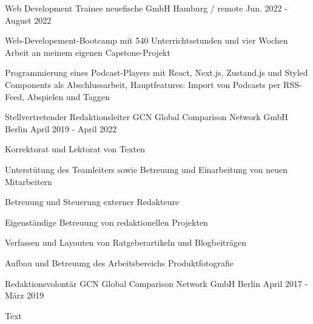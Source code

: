 

\begin{cventries}

  \cventry
    {Web Development Trainee} %
    {neuefische GmbH} %
    {Hamburg / remote} %
    {Jun. 2022 - August 2022} %
    {
      \begin{cvitems} %
        \item {Web-Developement-Bootcamp mit 540 Unterrichtsstunden und vier Wochen Arbeit an meinem eigenen Capstone-Projekt}
        \item {Programmierung eines Podcast-Players mit React, Next.js, Zustand.js und Styled Components als Abschlussarbeit, Hauptfeatures: Import von Podcasts per RSS-Feed, Abspielen und Taggen}
      \end{cvitems}
    }

  \cventry
    {Stellvertretender Redaktionsleiter} %
    {GCN Global Comparison Network GmbH} %
    {Berlin} %
    {April 2019 - April 2022} %
    {
      \begin{cvitems} %
        \item {Korrektorat und Lektorat von Texten}
        \item {Unterstütung des Teamleiters sowie Betreuung und Einarbeitung von neuen Mitarbeitern}
        \item {Betreuung und Steuerung externer Redakteure}
        \item {Eigenständige Betreuung von redaktionellen Projekten}
        \item {Verfassen und Layouten von Ratgeberartikeln und Blogbeiträgen}
        \item {Aufbau und Betreuung des Arbeitsbereichs Produktfotografie}
      \end{cvitems}
    }

  \cventry
    {Redaktionsvolontär} %
    {GCN Global Comparison Network GmbH} %
    {Berlin} %
    {April 2017 - März 2019} %
    {
      \begin{cvitems} %
        \item {Text}
       \end{cvitems}
    }


\end{cventries}
